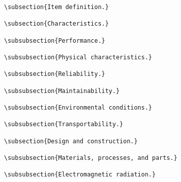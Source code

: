\begin{itemize}
\begin{small}
\begin{verbatim}
\subsection{Item definition.}

\subsection{Characteristics.}

\subsubsection{Performance.}

\subsubsection{Physical characteristics.}

\subsubsection{Reliability.}

\subsubsection{Maintainability.}

\subsubsection{Environmental conditions.}

\subsubsection{Transportability.}

\subsection{Design and construction.}

\subsubsection{Materials, processes, and parts.}

\subsubsection{Electromagnetic radiation.}


\end{verbatim}
\end{small}
\end{itemize}

